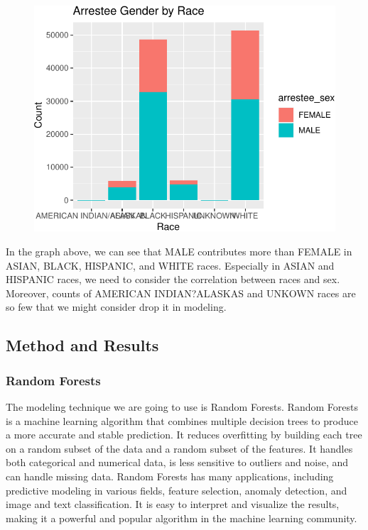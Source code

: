 \documentclass[
  article]{jss}
\begin{document}
\begin{figure}[H]

{\centering \includegraphics{final-report_files/figure-pdf/unnamed-chunk-13-1.pdf}

}

\end{figure}

In the graph above, we can see that MALE contributes more than FEMALE in
ASIAN, BLACK, HISPANIC, and WHITE races. Especially in ASIAN and
HISPANIC races, we need to consider the correlation between races and
sex. Moreover, counts of AMERICAN INDIAN?ALASKAS and UNKOWN races are so
few that we might consider drop it in modeling.

\hypertarget{method-and-results}{%
\subsection{Method and Results}\label{method-and-results}}

\hypertarget{random-forests}{%
\subsubsection{Random Forests}\label{random-forests}}

The modeling technique we are going to use is Random Forests. Random
Forests is a machine learning algorithm that combines multiple decision
trees to produce a more accurate and stable prediction. It reduces
overfitting by building each tree on a random subset of the data and a
random subset of the features. It handles both categorical and numerical
data, is less sensitive to outliers and noise, and can handle missing
data. Random Forests has many applications, including predictive
modeling in various fields, feature selection, anomaly detection, and
image and text classification. It is easy to interpret and visualize the
results, making it a powerful and popular algorithm in the machine
learning community.
\end{document}
